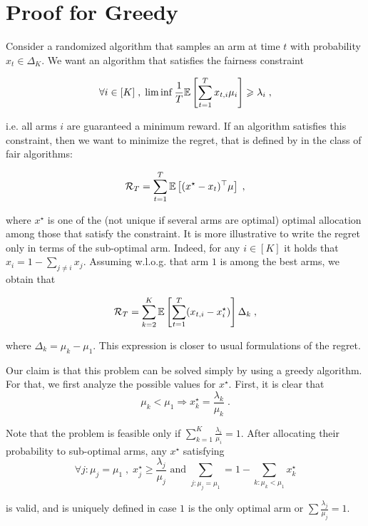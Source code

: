 \section{Proof for Greedy}

Consider a randomized algorithm that samples an arm at time $t$ with probability $x_t \in \Delta_K$. We want an algorithm that satisfies the fairness constraint

\[\forall i \in [K]\;, \; \liminf \frac{1}{T} \mathbb{E}\left[\sum_{t=1}^T x_{t,i} \mu_i \right] \geqslant \lambda_i \;,\]

i.e. all arms $i$ are guaranteed a minimum reward. If an algorithm satisfies this constraint, then we want to minimize the regret, that is defined by in the class of fair algorithms:

\[ \mathcal{R}_T = \sum_{t=1}^T \mathbb{E}\left[(x^\star - x_t)^\top\mu \right]\;, \]

where $x^\star$ is one of the (not unique if several arms are optimal) optimal allocation among those that satisfy the constraint. It is more illustrative to write the regret only in terms of the sub-optimal arm. Indeed, for any $i\in [K]$ it holds that $x_i = 1-\sum_{j \neq i } x_j$. Assuming w.l.o.g. that arm $1$ is among the best arms, we obtain that 

\begin{equation}\label{eq::regret}\mathcal{R}_T =  \sum_{k=2}^K \mathbb{E}\left[\sum_{t=1}^T (x_{t, i} - x^\star_i)\right] \Delta_k \;, \end{equation}

where $\Delta_k = \mu_k - \mu_1$. This expression is closer to usual formulations of the regret.

Our claim is that this problem can be solved simply by using a greedy algorithm. For that, we first analyze the possible values for $x^\star$. First, it is clear that \[ \mu_k < \mu_1 \Rightarrow x_k^\star = \frac{\lambda_k}{\mu_k} \;. \]

Note that the problem is feasible only if $\sum_{k=1}^{K}\frac{\lambda_i}{\mu_i}=1$. After allocating their probability to sub-optimal arms, any $x^\star$ satisfying \[ \forall j: \mu_j =\mu_1\;, \; x_j^\star \geq \frac{\lambda_j}{\mu_j} \text{ and } \sum_{j: \mu_j=\mu_1} = 1 -\sum_{k: \mu_k<\mu_1} x_k^\star \]

is valid, and is uniquely defined in case $1$ is the only optimal arm or $\sum \frac{\lambda_j}{\mu_j}=1$.

